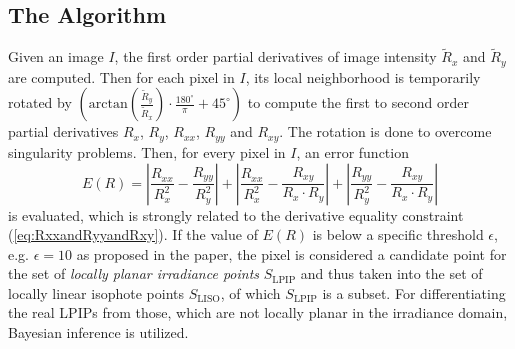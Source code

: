 \subsection{The Algorithm}
\label{subsec:geoinvalgo}
Given an image $I$, the first order partial derivatives of image intensity $\widetilde{R}_x$ and $\widetilde{R}_y$ are computed. Then for each pixel in $I$, its local neighborhood is temporarily rotated by $(\mathrm{arctan}(\frac{\widetilde{R}_y}{\widetilde{R}_x}) \cdot \frac{180^\circ}{\pi} + 45^\circ)$ to compute the first to second order partial derivatives $R_x$, $R_y$, $R_{xx}$, $R_{yy}$ and $R_{xy}$. The rotation is done to overcome singularity problems. Then, for every pixel in $I$, an error function
\begin{equation}
	E(R) = \left|\frac{R_{xx}}{R_x^2} - \frac{R_{yy}}{R_y^2}\right| + 
				 \left|\frac{R_{xx}}{R_x^2} - \frac{R_{xy}}{R_x \cdot R_y}\right| + 
				 \left|\frac{R_{yy}}{R_y^2} - \frac{R_{xy}}{R_x \cdot R_y}\right|
	\label{eq:errorfunction}
\end{equation}
is evaluated, which is strongly related to the derivative equality constraint (\autoref{eq:RxxandRyyandRxy}). If the value of $E(R)$ is below a specific threshold $\epsilon$, e.g. $\epsilon = 10$ as proposed in the paper, the pixel is considered a candidate point for the set of \emph{locally planar irradiance points} $S_\text{LPIP}$ and thus taken into the set of locally linear isophote points $S_\text{LISO}$, of which $S_\text{LPIP}$ is a subset. For differentiating the real LPIPs from those, which are not locally planar in the irradiance domain, Bayesian inference is utilized.

